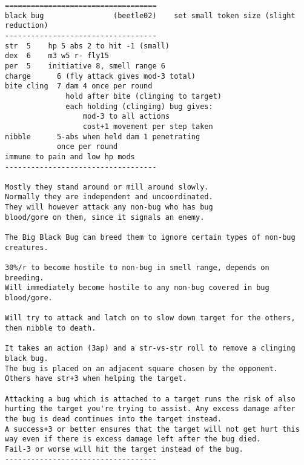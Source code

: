 \goodbreak \begin{samepage} \small \begin{verbatim}
===================================
black bug                (beetle02)    set small token size (slight reduction)
-----------------------------------
str  5    hp 5 abs 2 to hit -1 (small)
dex  6    m3 w5 r- fly15
per  5    initiative 8, smell range 6
charge      6 (fly attack gives mod-3 total)
bite cling  7 dam 4 once per round
              hold after bite (clinging to target)
              each holding (clinging) bug gives:
                  mod-3 to all actions
                  cost+1 movement per step taken
nibble      5-abs when held dam 1 penetrating
            once per round
immune to pain and low hp mods
-----------------------------------

Mostly they stand around or mill around slowly.
Normally they are independent and uncoordinated.
They will however attack any non-bug who has bug
blood/gore on them, since it signals an enemy.

The Big Black Bug can breed them to ignore certain types of non-bug creatures.

30%/r to become hostile to non-bug in smell range, depends on breeding.
Will immediately become hostile to any non-bug covered in bug blood/gore.

Will try to attack and latch on to slow down target for the others,
then nibble to death.

It takes an action (3ap) and a str-vs-str roll to remove a clinging black bug.
The bug is placed on an adjacent square chosen by the opponent.
Others have str+3 when helping the target.

Attacking a bug which is attached to a target runs the risk of also
hurting the target you're trying to assist. Any excess damage after
the bug is dead continues into the target instead.
A success+3 or better ensures that the target will not get hurt this
way even if there is excess damage left after the bug died.
Fail-3 or worse will hit the target instead of the bug.
-----------------------------------
\end{verbatim} \normalsize \end{samepage}

\

